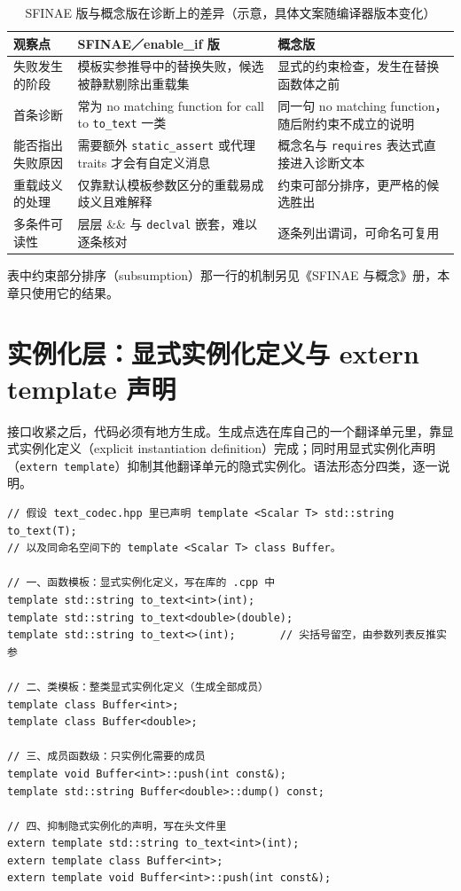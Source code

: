 \documentclass[12pt,a4paper,fontset=fandol]{ctexbook}
\newcommand{\kw}[1]{\texttt{#1}}
\begin{document}
\begin{table}[htbp]
\centering
\caption{SFINAE 版与概念版在诊断上的差异（示意，具体文案随编译器版本变化）}
\begin{tabularx}{0.83\textwidth}{>{\raggedright\arraybackslash}p{} >{\raggedright\arraybackslash}p{} X}
\toprule
\textbf{观察点} & \textbf{SFINAE／enable\_if 版} & \textbf{概念版} \\
\midrule
失败发生的阶段 & 模板实参推导中的替换失败，候选被静默剔除出重载集 & 显式的约束检查，发生在替换函数体之前 \\
\addlinespace
首条诊断 & 常为 no matching function for call to \kw{to\_text} 一类 & 同一句 no matching function，随后附约束不成立的说明 \\
\addlinespace
能否指出失败原因 & 需要额外 \kw{static\_assert} 或代理 traits 才会有自定义消息 & 概念名与 \kw{requires} 表达式直接进入诊断文本 \\
\addlinespace
重载歧义的处理 & 仅靠默认模板参数区分的重载易成歧义且难解释 & 约束可部分排序，更严格的候选胜出 \\
\addlinespace
多条件可读性 & 层层 \&\& 与 \kw{declval} 嵌套，难以逐条核对 & 逐条列出谓词，可命名可复用 \\
\bottomrule
\end{tabularx}
\end{table}

表中约束部分排序（subsumption）那一行的机制另见《SFINAE 与概念》册，本章只使用它的结果。

\section{实例化层：显式实例化定义与 extern template 声明}

接口收紧之后，代码必须有地方生成。生成点选在库自己的一个翻译单元里，靠显式实例化定义（explicit instantiation definition）完成；同时用显式实例化声明（\kw{extern template}）抑制其他翻译单元的隐式实例化。语法形态分四类，逐一说明。

\begin{lstlisting}[style=cppstyle,caption={显式实例化的几种语法形态（函数模板与类模板为主）}]
// 假设 text_codec.hpp 里已声明 template <Scalar T> std::string to_text(T);
// 以及同命名空间下的 template <Scalar T> class Buffer。

// 一、函数模板：显式实例化定义，写在库的 .cpp 中
template std::string to_text<int>(int);
template std::string to_text<double>(double);
template std::string to_text<>(int);       // 尖括号留空，由参数列表反推实参

// 二、类模板：整类显式实例化定义（生成全部成员）
template class Buffer<int>;
template class Buffer<double>;

// 三、成员函数级：只实例化需要的成员
template void Buffer<int>::push(int const&);
template std::string Buffer<double>::dump() const;

// 四、抑制隐式实例化的声明，写在头文件里
extern template std::string to_text<int>(int);
extern template class Buffer<int>;
extern template void Buffer<int>::push(int const&);
\end{lstlisting}
\end{document}
